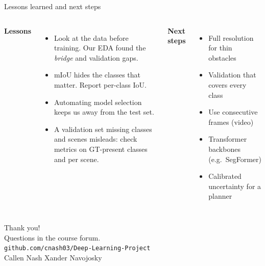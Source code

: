 \documentclass[aspectratio=169,11pt]{beamer}
\newcommand{\cls}[1]{\textit{#1}}
\begin{document}
\begin{frame}{Lessons learned and next steps}
\begin{columns}[T]
\textbf{\color{trail}Lessons}
\begin{itemize}\setlength\itemsep{5pt}
  \item Look at the data before training. Our EDA found the \cls{bridge} and validation gaps.
  \item mIoU hides the classes that matter. Report per-class IoU.
  \item Automating model selection keeps us away from the test set.
  \item A validation set missing classes and scenes misleads: check metrics on GT-present classes and per scene.
\end{itemize}
\textbf{\color{trail}Next steps}
\begin{itemize}\setlength\itemsep{5pt}
  \item Full resolution for thin obstacles
  \item Validation that covers every class
  \item Use consecutive frames (video)
  \item Transformer backbones (e.g.\ SegFormer)
  \item Calibrated uncertainty for a planner
\end{itemize}
\end{columns}
\end{frame}

\begin{frame}[standout]
Thank you!\\[10pt]
\normalsize Questions in the course forum.\\[4pt]
\small\texttt{github.com/cnash03/Deep-Learning-Project}\\[8pt]
\footnotesize Callen Nash \textperiodcentered{} Xander Navojosky
\end{frame}
\end{document}
